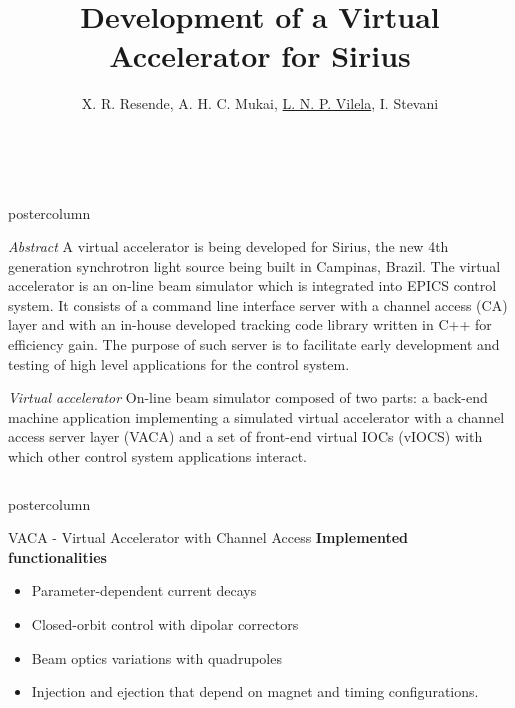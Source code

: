 \documentclass[20pt]{beamer}
\title{\huge Development of a Virtual Accelerator for Sirius}
\author{X. R. Resende, A. H. C. Mukai, \underline{L. N. P. Vilela}, I. Stevani}
\institute{Brazilian Synchrotron Light Laboratory (LNLS), Campinas, Brazil}
\date{\monthname \ \the\year}
\newlength{\abstractheight}
\newlength{\vaheight}
\newlength{\columnheight}
\begin{document}
\begin{frame}
\begin{beamercolorbox}[center]{postercolumn}
	\begin{minipage}{\textwidth}
		\parbox[t][\abstractheight]{\textwidth}{
		\begin{myblock}{\textit{Abstract}}
		A virtual accelerator is being developed for Sirius, the new 4th generation synchrotron light source being built in Campinas, Brazil.
		The virtual accelerator is an on-line beam simulator which is integrated into EPICS control system.
		It consists of a command line interface server with a channel access (CA) layer and with an in-house developed tracking code library written in C++ for efficiency gain.
		The purpose of such server is to facilitate early development and testing of high level applications for the control system.
		\end{myblock}
	}\end{minipage}
	\begin{minipage}{\textwidth}
		\parbox[t][\vaheight]{\textwidth}{
		\begin{myblock}{\textit{Virtual accelerator}}
		On-line beam simulator composed of two parts: a back-end machine
		application implementing a simulated virtual accelerator with a channel access server layer (VACA) and a set of
		front-end virtual IOCs (vIOCS) with which other control system applications interact.
		\end{myblock}
	}\end{minipage}	
\end{beamercolorbox}
\begin{columns}
	\begin{column}{0.55\textwidth}
		\begin{beamercolorbox}[center]{postercolumn}
			\begin{minipage}{.98\textwidth}  %
				\parbox[t][\columnheight]{\textwidth}{ %
					\vspace{1cm}
					\begin{myblock}{VACA - Virtual Accelerator with Channel Access}
						\textbf{Implemented functionalities}
						\begin{itemize}
							\item Parameter-dependent current decays
							\item Closed-orbit control with dipolar correctors
							\item Beam optics variations with quadrupoles
							\item Injection and ejection that depend on magnet and timing configurations.
						\end{itemize}
						\vspace{0.5cm}
						

\end{myblock}}
\end{minipage}
\end{beamercolorbox}
\end{column}
\end{columns}
\end{frame}
\end{document}
